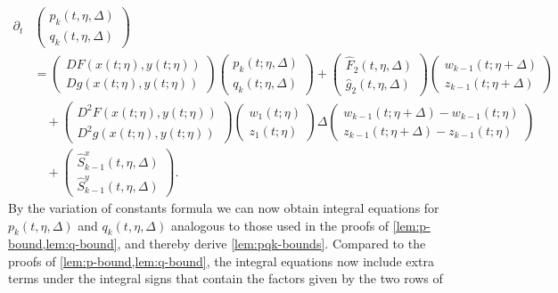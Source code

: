 \documentclass[a4paper]{siamart190516}
\begin{document}
\begin{align*}
\partial_t &\begin{pmatrix} p_k(t, \eta, \Delta) \\  q_k(t,\eta,\Delta)   \end{pmatrix}  \\
&= \begin{pmatrix} DF(x(t;\eta),y(t;\eta))  \\  Dg(x(t;\eta), y(t;\eta))    \end{pmatrix} \begin{pmatrix} p_k(t; \eta, \Delta) \\ q_k(t; \eta, \Delta)  \end{pmatrix}   +    \begin{pmatrix} \hat{F}_2(t, \eta, \Delta)   \\  \hat{g}_2(t, \eta, \Delta)  \end{pmatrix} \begin{pmatrix} w_{k-1}(t; \eta+\Delta) \\ z_{k-1}(t; \eta + \Delta)  \end{pmatrix} \\
&\quad + \begin{pmatrix} D^2 F(x(t;\eta),y(t;\eta))  \\  D^2 g(x(t;\eta), y(t;\eta)) \end{pmatrix}  \begin{pmatrix} w_1(t; \eta) \\ z_1(t; \eta )  \end{pmatrix} \Delta \begin{pmatrix}  w_{k-1}(t; \eta+\Delta) - w_{k-1}(t; \eta)\\  z_{k-1}(t;\eta+\Delta) -z_{k-1}(t; \eta) \end{pmatrix}  \\
&\quad + \begin{pmatrix} \hat{S}^x_{k-1}(t, \eta, \Delta) \\  \hat{S}^y_{k-1}(t, \eta, \Delta)  \end{pmatrix}.
\end{align*}
By the variation of constants formula we can now obtain integral equations for
$p_k(t, \eta, \Delta)$ and $q_k(t,\eta,\Delta)$ analogous to those used in the proofs
of \cref{lem:p-bound,lem:q-bound}, and thereby derive \cref{lem:pqk-bounds}. Compared
to the proofs of \cref{lem:p-bound,lem:q-bound}, the integral
equations now include extra terms under the integral signs that contain the factors
given by the two rows of
\end{document}
